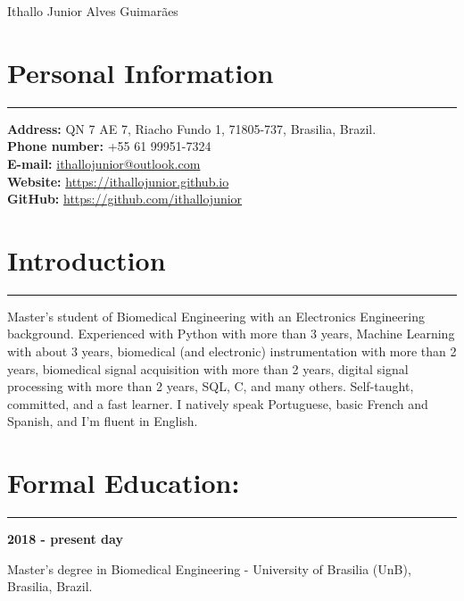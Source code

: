 \documentclass[11pt]{article}
\begin{document}
\begin{center}
\huge{Ithallo Junior Alves Guimarães}
\end{center}

\section{Personal Information}
\hrule \vspace{0.1cm}

\begin{addmargin}{0.5cm}

\textbf{Address:}  QN 7 AE 7, Riacho Fundo 1, 71805-737, Brasilia, Brazil. \\
\textbf{Phone number:}  +55 61 99951-7324 \\
\textbf{E-mail:}   \href{maito:ithallojunior@outlook.com}{ithallojunior@outlook.com} \\
\textbf{Website:}  \url{https://ithallojunior.github.io}  \\
\textbf{GitHub:} \url{https://github.com/ithallojunior}

\end{addmargin}

\section{Introduction}
\hrule \vspace{0.1cm}

\begin{addmargin}{0.5cm}
Master's student of Biomedical Engineering with an Electronics Engineering background.
Experienced with Python with more than 3 years, Machine Learning with about 3 years, 
biomedical (and electronic) instrumentation with more than 2 years, biomedical signal 
acquisition with more than 2 years, digital signal processing with more than 2 years, SQL, C, 
and many others. Self-taught, committed, and a fast learner. I natively speak Portuguese,
basic French and Spanish, and I'm fluent in English.

\end{addmargin}

\section{Formal Education:}
\hrule \vspace{0.1cm}

\textbf{2018 - present day}
\begin{addmargin}{0.5cm}
Master's degree in Biomedical Engineering - University of Brasilia (UnB), Brasilia, Brazil. \\
\end{addmargin}
\end{document}
